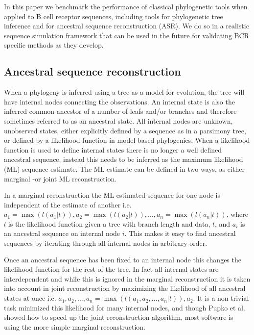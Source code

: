 In this paper we benchmark the performance of classical phylogenetic tools when applied to B cell receptor sequences, including tools for phylogenetic tree inference and for ancestral sequence reconstruction (ASR).
We do so in a realistic sequence simulation framework that can be used in the future for validating BCR specific methods as they develop.




\subsection{Ancestral sequence reconstruction}
When a phylogeny is inferred using a tree as a model for evolution, the tree will have internal nodes connecting the observations.
An internal state is also the inferred common ancestor of a number of leafs and/or branches and therefore sometimes referred to as an ancestral state.
All internal nodes are unknown, unobserved states, either explicitly defined by a sequence as in a parsimony tree, or defined by a likelihood function in model based phylogenies.
When a likelihood function is used to define internal states there is no longer a well defined ancestral sequence, instead this needs to be inferred as the maximum likelihood (ML) sequence estimate.
The ML estimate can be defined in two ways, as either marginal -or joint ML reconstruction.

In a marginal reconstruction the ML estimated sequence for one node is independent of the estimate of another i.e. $a_1 = \operatorname{max}(l(a_1 | t)), a_2 = \operatorname{max}(l(a_2 | t)), \hdots, a_n = \operatorname{max}(l(a_n | t))$, where $l$ is the likelihood function given a tree with branch length and data, $t$, and $a_i$ is an ancestral sequence on internal node $i$.
This makes it easy to find ancestral sequences by iterating through all internal nodes in arbitrary order.

Once an ancestral sequence has been fixed to an internal node this changes the likelihood function for the rest of the tree.
In fact all internal states are interdependent and while this is ignored in the marginal reconstruction it is taken into account in joint reconstruction by maximizing the likelihood of all ancestral states at once i.e. $a_1, a_2, \hdots, a_n = \operatorname{max}(l(a_1, a_2, \hdots, a_n | t)), a_2$.
It is a non trivial task minimized this likelihood for many internal nodes, and though Pupko et al. \cite{pupko2000fast} showed how to speed up the joint reconstruction algorithm, most software is using the more simple marginal reconstruction.

